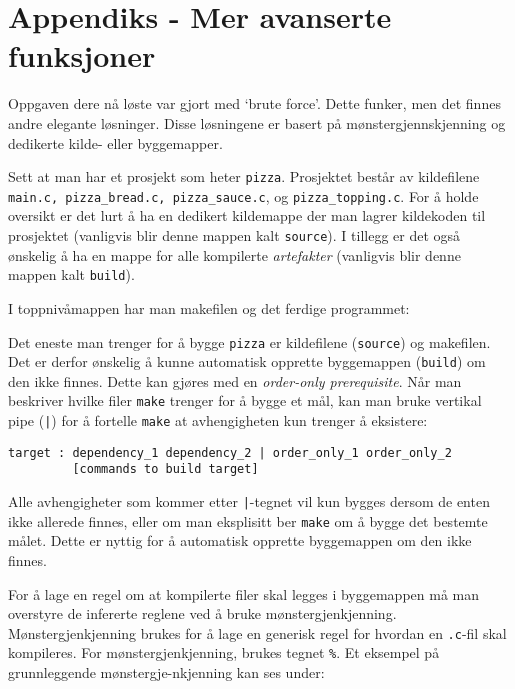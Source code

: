 \appendix

\section{Appendiks - Mer avanserte funksjoner}\label{4-appendiks}


Oppgaven dere nå løste var gjort med `brute force'. Dette funker, men det finnes andre elegante løsninger. Disse løsningene er basert på mønstergjennskjenning og dedikerte kilde- eller byggemapper.

Sett at man har et prosjekt som heter \verb|pizza|. Prosjektet består av kildefilene \verb|main.c, pizza_bread.c, pizza_sauce.c|, og \verb|pizza_topping.c|. For å holde oversikt er det lurt å ha en dedikert kildemappe der man lagrer kildekoden til prosjektet (vanligvis blir denne mappen kalt \verb|source|). I tillegg er det også ønskelig å ha en mappe for alle kompilerte \textit{artefakter} (vanligvis blir denne mappen kalt \verb|build|). 

I toppnivåmappen har man makefilen og det ferdige programmet:


Det eneste man trenger for å bygge \verb|pizza| er kildefilene (\verb|source|) og makefilen. Det er derfor ønskelig å kunne automatisk opprette byggemappen (\verb|build|) om den ikke finnes. Dette kan gjøres med en \textit{order-only prerequisite}. Når man beskriver hvilke filer \verb|make| trenger for å bygge et mål, kan man bruke vertikal pipe (\texttt{|}) for å fortelle \verb|make| at avhengigheten kun trenger å eksistere:

\begin{lstlisting}
target : dependency_1 dependency_2 | order_only_1 order_only_2
         [commands to build target]
\end{lstlisting}

Alle avhengigheter som kommer etter \texttt{|}-tegnet vil kun bygges dersom de enten ikke allerede finnes, eller om man eksplisitt ber \verb|make| om å bygge det bestemte målet. Dette er nyttig for å automatisk opprette byggemappen om den ikke finnes. 

For å lage en regel om at kompilerte filer skal legges i byggemappen må man overstyre de infererte reglene ved å bruke mønstergjenkjenning. Mønstergjenkjenning brukes for å lage en generisk regel for hvordan en \verb|.c|-fil skal kompileres. For mønstergjenkjenning, brukes tegnet \verb|%|. Et eksempel på grunnleggende  mønstergje-\newline nkjenning kan ses under:

